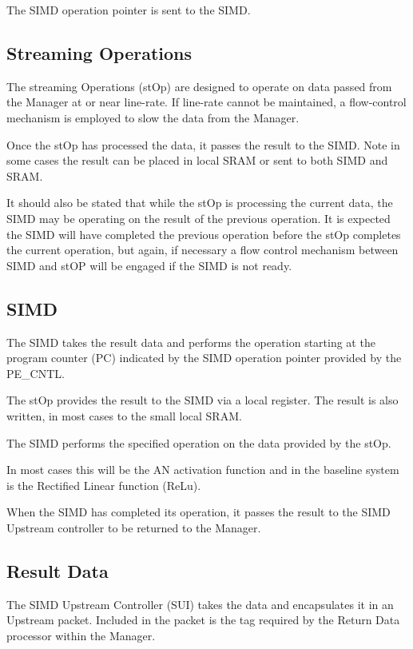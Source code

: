 The SIMD operation pointer is sent to the SIMD.

\subsection{Streaming Operations}
\label{ssec:stOps}

The streaming Operations (stOp) are designed to operate on data passed from the Manager at or near line-rate. If line-rate cannot be maintained, a flow-control mechanism is employed to slow the data from the Manager.

Once the stOp has processed the data, it passes the result to the SIMD. Note in some cases the result can be placed in local SRAM or sent to both SIMD and SRAM.

It should also be stated that while the stOp is processing the current data, the SIMD may be operating on the result of the previous operation. It is expected the SIMD will have completed the previous operation before the stOp completes the current operation, but again, if necessary a flow control mechanism between SIMD and stOP will be engaged if the SIMD is not ready.

\subsection{SIMD}
\label{ssec:simd}

The SIMD takes the result data and performs the operation starting at the program counter (PC) indicated by the SIMD operation pointer provided by the PE\_CNTL.

The stOp provides the result to the SIMD via a local register. The result is also written, in most cases to the small local SRAM.

The SIMD performs the specified operation on the data provided by the stOp.

In most cases this will be the AN activation function and in the baseline system is the Rectified Linear function (ReLu).

When the SIMD has completed its operation, it passes the result to the SIMD Upstream controller to be returned to the Manager.

\subsection{Result Data}
\label{ssec:result}

The SIMD Upstream Controller (SUI) takes the data and encapsulates it in an Upstream packet. Included in the packet is the tag required by the Return Data processor within the Manager.



